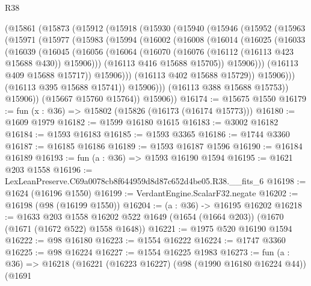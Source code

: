 \begin{lexlean}{R38}
\begin{coremodule}
      (@15861
        (@15873
          (@15912
            (@15918
              (@15930
                (@15940
                  (@15946
                    (@15952
                      (@15963
                        (@15971
                          (@15977
                            (@15983
                              (@15994
                                (@16002
                                  (@16008
                                    (@16014
                                      (@16025
                                        (@16033
                                          (@16039
                                            (@16045
                                              (@16056
                                                (@16064
                                                  (@16070
                                                    (@16076
                                                      (@16112 (@16113 @423 @15688 @430))
                                                      @15906)))
                                                (@16113 @416 @15688 @15705))
                                              @15906)))
                                        (@16113 @409 @15688 @15717))
                                      @15906)))
                                (@16113 @402 @15688 @15729))
                              @15906)))
                        (@16113 @395 @15688 @15741))
                      @15906)))
                (@16113 @388 @15688 @15753))
              @15906))
          (@15667 @15760 @15764))
        @15906))
@16174 := @15675 @1550
@16179 := fun (x : @36) => @15802 (@15826 (@16173 (@16174 @15773)))
@16180 := @1609 @1979
@16182 := @1599 @16180 @1615
@16183 := @3002 @16182
@16184 := @1593 @16183
@16185 := @1593 @3365
@16186 := @1744 @3360
@16187 := @16185 @16186
@16189 := @1593 @16187 @1596
@16190 := @16184 @16189
@16193 := fun (a : @36) => @1593 @16190 @1594
@16195 := @1621 @203 @1558
@16196 := LexLeanPreserve.C69a0078cb8f644959d8d87c652d4be05.R38.__fits_6
@16198 := @1624 (@16196 @1550)
@16199 := VerdantEngine.ScalarF32.negate
@16202 := @16198 (@98 (@16199 @1550))
@16204 := (a : @36) -> @16195 @16202
@16218 := @1633
    @203
    @1558
    @16202
    @522
    @1649
    (@1654 (@1664 @203))
    (@1670 (@1671 (@1672 @522) @1558 @1648))
@16221 := @1975 @520 @16190 @1594
@16222 := @98 @16180
@16223 := @1554 @16222
@16224 := @1747 @3360
@16225 := @98 @16224
@16227 := @1554 @16225 @1983
@16273 := fun (a : @36) =>
  @16218
    (@16221
      (@16223 @16227)
      (@98 (@1990 @16180 @16224 @44))
      (@1691

\end{coremodule}
\end{lexlean}
